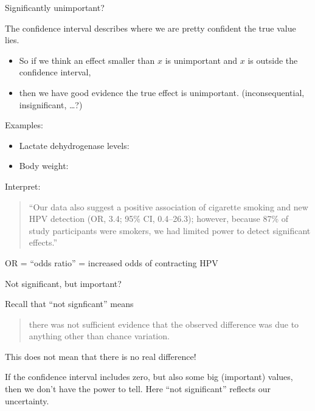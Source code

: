 \begin{frame}{Significantly unimportant?}

    The \alert{confidence interval} describes where we are pretty confident the true value lies.

    \begin{itemize}

    \item So if we think an effect smaller than $x$ is \alert{unimportant}
      and $x$ is outside the confidence interval,

    \item then we have good evidence the true effect is unimportant.
      (inconsequential, insignificant, \ldots?)

    \end{itemize}

    \vspace{2em}

    Examples:
    \begin{itemize}
      \item Lactate dehydrogenase levels:
      \item Body weight:
    \end{itemize}

\end{frame}

\begin{frame}{Interpret:}

  \begin{quote}
    ``Our data also suggest a positive association of cigarette smoking and new HPV detection (OR, 3.4; 95\% CI, 0.4--26.3); {however, because 87\% of study participants were smokers, we had limited power to detect significant effects.}''
  \end{quote}

  \vspace{2em}

  OR = ``odds ratio'' = increased odds of contracting HPV

\end{frame}


\begin{frame}{Not significant, but important?}

    Recall that ``not signficant'' means
    \begin{quote}
        there was not sufficient evidence that the observed difference was due to anything other than chance variation.
    \end{quote}


    \vspace{2em}

    This does \alert{not} mean that there is no real difference!

    \vspace{2em}

    If the confidence interval includes zero, but also some big (important) values,
    then we don't have the \alert{power} to tell.  
    Here ``not significant'' reflects our uncertainty.



\end{frame}


